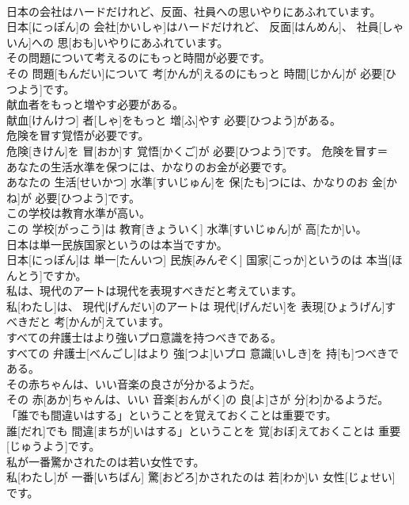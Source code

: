 \documentclass[8pt]{extreport}
\begin{document}
\begin{CJK}{UTF8}{min}
\\	日本の会社はハードだけれど、反面、社員への思いやりにあふれています。	
\\	日本[にっぽん]の 会社[かいしゃ]はハードだけれど、 反面[はんめん]、 社員[しゃいん]への 思[おも]いやりにあふれています。	
\\	その問題について考えるのにもっと時間が必要です。	
\\	その 問題[もんだい]について 考[かんが]えるのにもっと 時間[じかん]が 必要[ひつよう]です。	
\\	献血者をもっと増やす必要がある。	
\\	献血[けんけつ] 者[しゃ]をもっと 増[ふ]やす 必要[ひつよう]がある。	
\\	危険を冒す覚悟が必要です。	
\\	危険[きけん]を 冒[おか]す 覚悟[かくご]が 必要[ひつよう]です。	危険を冒す＝ 
\\	あなたの生活水準を保つには、かなりのお金が必要です。	
\\	あなたの 生活[せいかつ] 水準[すいじゅん]を 保[たも]つには、かなりのお 金[かね]が 必要[ひつよう]です。	
\\	この学校は教育水準が高い。	
\\	この 学校[がっこう]は 教育[きょういく] 水準[すいじゅん]が 高[たか]い。	
\\	日本は単一民族国家というのは本当ですか。	
\\	日本[にっぽん]は 単一[たんいつ] 民族[みんぞく] 国家[こっか]というのは 本当[ほんとう]ですか。	
\\	私は、現代のアートは現代を表現すべきだと考えています。	
\\	私[わたし]は、 現代[げんだい]のアートは 現代[げんだい]を 表現[ひょうげん]すべきだと 考[かんが]えています。	
\\	すべての弁護士はより強いプロ意識を持つべきである。	
\\	すべての 弁護士[べんごし]はより 強[つよ]いプロ 意識[いしき]を 持[も]つべきである。	
\\	その赤ちゃんは、いい音楽の良さが分かるようだ。	
\\	その 赤[あか]ちゃんは、いい 音楽[おんがく]の 良[よ]さが 分[わ]かるようだ。	
\\	「誰でも間違いはする」ということを覚えておくことは重要です。	
\\	誰[だれ]でも 間違[まちが]いはする」ということを 覚[おぼ]えておくことは 重要[じゅうよう]です。	
\\	私が一番驚かされたのは若い女性です。	
\\	私[わたし]が 一番[いちばん] 驚[おどろ]かされたのは 若[わか]い 女性[じょせい]です。	

\end{CJK}
\end{document}
